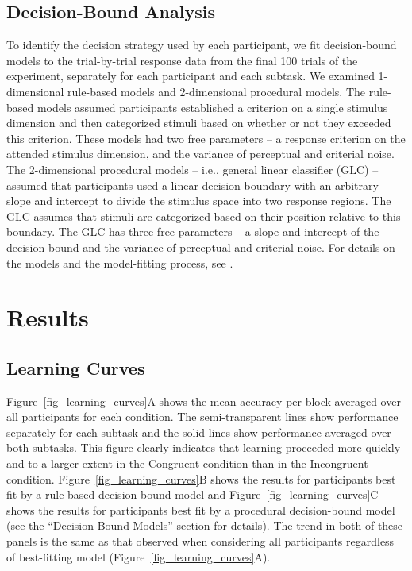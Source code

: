 \documentclass[doc, floatsintext]{apa7}
\begin{document}
\subsection{Decision-Bound Analysis}
To identify the decision strategy used by each participant,
we fit decision-bound models
\parencite{AshbyValentin2018} to
the trial-by-trial response data from the final 100 trials
of the experiment, separately for each participant and each subtask. We examined
1-dimensional rule-based models and 2-dimensional procedural
models.  The rule-based models assumed participants established a criterion on a single stimulus dimension and
then categorized stimuli based on whether or not they exceeded this criterion. These models had two free parameters -- a response criterion on the attended stimulus dimension, and the variance of perceptual and criterial noise. The 2-dimensional procedural models --
i.e., general linear classifier (GLC) --  assumed that participants used a linear decision boundary with an arbitrary slope and intercept to divide the stimulus space into two response regions. The GLC assumes that stimuli are categorized based on their position relative to this boundary. The GLC has three free parameters -- a slope and intercept of the decision bound and the variance of perceptual and criterial noise. For details on the models and the model-fitting process, see \textcite{AshbyValentin2018}.

\section{Results}

\subsection{Learning Curves}
Figure~\ref{fig_learning_curves}A shows the mean accuracy per block averaged over all participants for each condition.
The semi-transparent lines show performance separately for
each subtask and the solid lines show performance averaged
over both subtasks.  This figure clearly indicates that
learning proceeded more quickly and to a larger extent in
the Congruent condition than in the Incongruent condition.
Figure~\ref{fig_learning_curves}B shows the results for
participants best fit by a rule-based decision-bound model
and Figure~\ref{fig_learning_curves}C shows the results for
participants best fit by a procedural decision-bound model
(see the ``Decision Bound Models'' section for details). The
trend in both of these panels is the same as that observed
when considering all participants regardless of best-fitting
model (Figure~\ref{fig_learning_curves}A).
\end{document}
